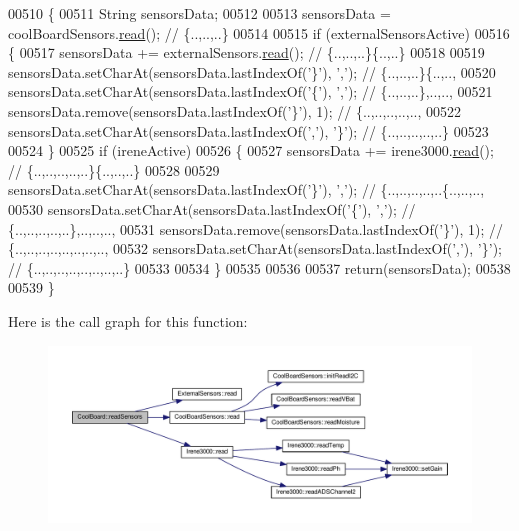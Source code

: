 \begin{DoxyCode}
00510 \{
00511     String sensorsData;
00512 
00513     sensorsData = coolBoardSensors.\hyperlink{class_cool_board_sensors_a91badb2539d91fda8679f2a597874c48}{read}(); \textcolor{comment}{// \{..,..,..\}}
00514     
00515     \textcolor{keywordflow}{if} (externalSensorsActive)
00516     \{
00517         sensorsData += externalSensors.\hyperlink{class_external_sensors_a53177b81eca3be89508b5511ddcd00fc}{read}(); \textcolor{comment}{// \{..,..,..\}\{..,..\}}
00518 
00519         sensorsData.setCharAt(sensorsData.lastIndexOf(\textcolor{charliteral}{'\}'}), \textcolor{charliteral}{','}); \textcolor{comment}{// \{..,..,..\}\{..,..,}
00520         sensorsData.setCharAt(sensorsData.lastIndexOf(\textcolor{charliteral}{'\{'}), \textcolor{charliteral}{','}); \textcolor{comment}{// \{..,..,..\},..,..,}
00521         sensorsData.remove(sensorsData.lastIndexOf(\textcolor{charliteral}{'\}'}), 1); \textcolor{comment}{// \{..,..,..,..,..,}
00522         sensorsData.setCharAt(sensorsData.lastIndexOf(\textcolor{charliteral}{','}), \textcolor{charliteral}{'\}'}); \textcolor{comment}{// \{..,..,..,..,..\}}
00523 
00524     \}
00525     \textcolor{keywordflow}{if} (ireneActive)
00526     \{
00527         sensorsData += irene3000.\hyperlink{class_irene3000_a852a170feea994ea1df01c6b245b5d9a}{read}(); \textcolor{comment}{// \{..,..,..,..,..\}\{..,..,..\}}
00528 
00529         sensorsData.setCharAt(sensorsData.lastIndexOf(\textcolor{charliteral}{'\}'}), \textcolor{charliteral}{','}); \textcolor{comment}{// \{..,..,..,..,..\{..,..,..,}
00530         sensorsData.setCharAt(sensorsData.lastIndexOf(\textcolor{charliteral}{'\{'}), \textcolor{charliteral}{','}); \textcolor{comment}{// \{..,..,..,..,..\},..,..,..,}
00531         sensorsData.remove(sensorsData.lastIndexOf(\textcolor{charliteral}{'\}'}), 1); \textcolor{comment}{// \{..,..,..,..,..,..,..,..,}
00532         sensorsData.setCharAt(sensorsData.lastIndexOf(\textcolor{charliteral}{','}), \textcolor{charliteral}{'\}'}); \textcolor{comment}{// \{..,..,..,..,..,..,..,..\}}
00533         
00534     \}
00535 
00536 
00537     \textcolor{keywordflow}{return}(sensorsData);
00538 
00539 \}
\end{DoxyCode}
Here is the call graph for this function\+:
\nopagebreak
\begin{figure}[H]
\begin{center}
\leavevmode
\includegraphics[width=350pt]{class_cool_board_ad03abdce2e65f520bbf2cff0f2d083cf_cgraph}
\end{center}
\end{figure}
